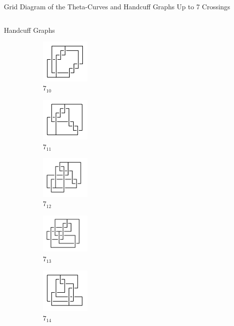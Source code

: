 \documentclass[final]{beamer}
\begin{document}
\begin{frame}[t]
\begin{alertblock}{Grid Diagram of the Theta-Curves and Handcuff Graphs Up to 7 Crossings}
\begin{columns}[t]
\begin{column}{0.3\textwidth}
\begin{alertblock}{Handcuff Graphs}
\begin{figure}
    \begin{subfigure}{0.15\textwidth}
    \includegraphics[width=2.4cm]{../Midterm_Poster/grid_diagram/handcuff_7_10.png}
    \caption{$7_{10}$} 
    \end{subfigure}
    \begin{subfigure}{0.15\textwidth}
    \includegraphics[width=2.4cm]{../Midterm_Poster/grid_diagram/handcuff_7_11.png}
    \caption{$7_{11}$} 
    \end{subfigure}
    \begin{subfigure}{0.15\textwidth}
    \includegraphics[width=2.4cm]{../Midterm_Poster/grid_diagram/handcuff_7_12.png}
    \caption{$7_{12}$} 
    \end{subfigure}
    \begin{subfigure}{0.15\textwidth}
    \includegraphics[width=2.4cm]{../Midterm_Poster/grid_diagram/handcuff_7_13.png}
    \caption{$7_{13}$} 
    \end{subfigure}
    \begin{subfigure}{0.15\textwidth}
    \includegraphics[width=2.4cm]{../Midterm_Poster/grid_diagram/handcuff_7_14.png}
    \caption{$7_{14}$} 
    \end{subfigure}
    \begin{subfigure}{0.15\textwidth}

\end{subfigure}
\end{figure}
\end{alertblock}
\end{column}
\end{columns}
\end{alertblock}
\end{frame}
\end{document}
